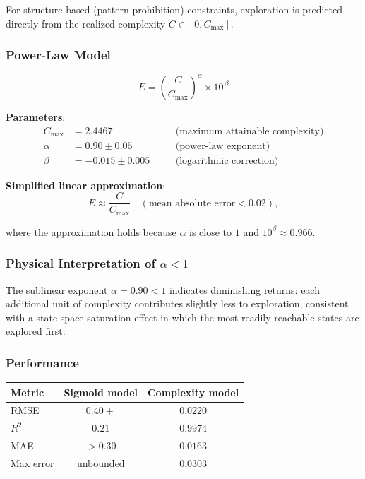 \documentclass[12pt,a4paper]{article}
\begin{document}
For structure-based (pattern-prohibition) constraints, exploration is predicted directly from the realized complexity $C \in [0, C_{\max}]$.

\subsubsection{Power-Law Model}

\begin{equation}\label{eq:complexity_model}
\boxed{
    E = \left(\frac{C}{C_{\max}}\right)^{\!\alpha} \times 10^{\,\beta}
}
\end{equation}

\noindent\textbf{Parameters}:
\begin{align}
    C_{\max} &= 2.4467 \quad &&\text{(maximum attainable complexity)}\label{eq:cmax}\\
    \alpha   &= 0.90 \pm 0.05 \quad &&\text{(power-law exponent)}\label{eq:alpha}\\
    \beta    &= -0.015 \pm 0.005 \quad &&\text{(logarithmic correction)}\label{eq:beta}
\end{align}

\noindent\textbf{Simplified linear approximation}:
\begin{equation}\label{eq:linear_approx}
    E \approx \frac{C}{C_{\max}} \quad (\text{mean absolute error} < 0.02),
\end{equation}

where the approximation holds because $\alpha$ is close to $1$ and $10^{\beta} \approx 0.966$.

\subsubsection{Physical Interpretation of $\alpha < 1$}

The sublinear exponent $\alpha = 0.90 < 1$ indicates diminishing returns: each additional unit of complexity contributes slightly less to exploration, consistent with a state-space saturation effect in which the most readily reachable states are explored first.

\subsubsection{Performance}

\begin{center}
\begin{tabular}{lcc}
\toprule
Metric & Sigmoid model & Complexity model \\
\midrule
RMSE   & $0.40+$   & $0.0220$ \\
$R^{2}$ & $0.21$   & $0.9974$ \\
MAE    & $>0.30$   & $0.0163$ \\
Max error & unbounded & $0.0303$ \\
\bottomrule
\end{tabular}
\end{center}
\end{document}
